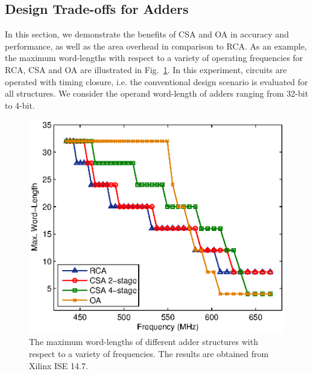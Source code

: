 \documentclass[10pt, conference, compsocconf]{IEEEtran}
\begin{document}
\subsection{Design Trade-offs for Adders}
In this section, we demonstrate the benefits of CSA and OA in accuracy and performance, as well as the area overhead in comparison to RCA. As an example, the maximum word-lengths with respect to a variety of operating frequencies for RCA, CSA and OA are illustrated in Fig.~\ref{Fig:max_wl_adder}. In this experiment, circuits are operated with timing closure, i.e. the conventional design scenario is evaluated for all structures. We consider the operand word-length of adders ranging from 32-bit to 4-bit.
%
\begin{figure}[tbp]
  \centering
  \includegraphics[width=.5\textwidth]{./figures/exp/max_wl.eps}
  \vspace{-4ex}
  \caption{The maximum word-lengths of different adder structures with respect to a variety of frequencies. The results are obtained from Xilinx ISE 14.7.}
  \label{Fig:max_wl_adder}
  \vspace{-2ex}
\end{figure}
\end{document}
